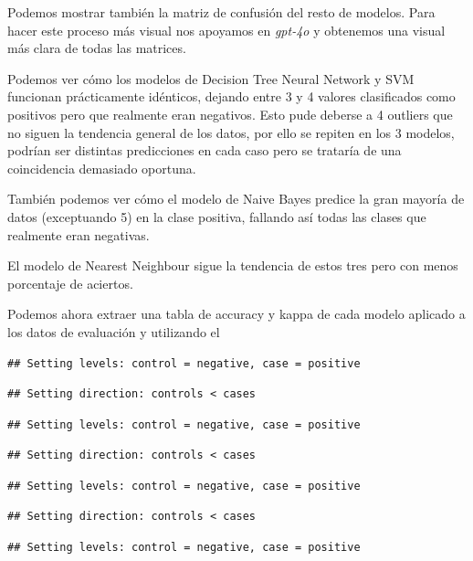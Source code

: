 \documentclass[
]{article}
\begin{document}
Podemos mostrar también la matriz de confusión del resto de modelos.
Para hacer este proceso más visual nos apoyamos en \emph{gpt-4o} y
obtenemos una visual más clara de todas las matrices.

Podemos ver cómo los modelos de Decision Tree Neural Network y SVM
funcionan prácticamente idénticos, dejando entre 3 y 4 valores
clasificados como positivos pero que realmente eran negativos. Esto pude
deberse a 4 outliers que no siguen la tendencia general de los datos,
por ello se repiten en los 3 modelos, podrían ser distintas predicciones
en cada caso pero se trataría de una coincidencia demasiado oportuna.

También podemos ver cómo el modelo de Naive Bayes predice la gran
mayoría de datos (exceptuando 5) en la clase positiva, fallando así
todas las clases que realmente eran negativas.

El modelo de Nearest Neighbour sigue la tendencia de estos tres pero con
menos porcentaje de aciertos.

Podemos ahora extraer una tabla de accuracy y kappa de cada modelo
aplicado a los datos de evaluación y utilizando el

\begin{verbatim}
## Setting levels: control = negative, case = positive
\end{verbatim}

\begin{verbatim}
## Setting direction: controls < cases
\end{verbatim}

\begin{verbatim}
## Setting levels: control = negative, case = positive
\end{verbatim}

\begin{verbatim}
## Setting direction: controls < cases
\end{verbatim}

\begin{verbatim}
## Setting levels: control = negative, case = positive
\end{verbatim}

\begin{verbatim}
## Setting direction: controls < cases
\end{verbatim}

\begin{verbatim}
## Setting levels: control = negative, case = positive
\end{verbatim}
\end{document}
